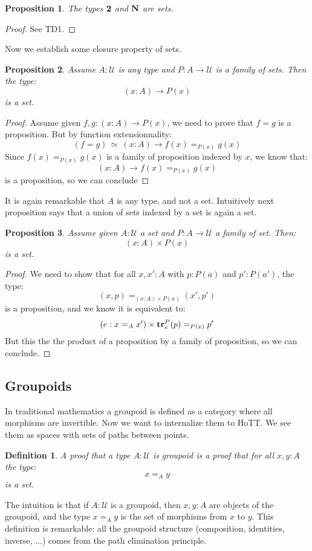 \documentclass{article}
\newcommand{\sse}[1]{\medbreak \subsection{#1}}
\newcommand{\U}{{\mathcal U}}
\renewcommand{\r}{\rightarrow}
\newcommand{\tr}{\mathrm{\bf tr}}
\newcommand{\N}{\mathrm{\bf N}}
\newcommand{\two}{{\bf 2}}
\newtheorem{definition}{Definition}
\newtheorem{proposition}{Proposition}
\begin{document}
\begin{proposition}
The types $\two$ and $\N$ are sets.
\end{proposition}
\begin{proof}
See TD1.
\end{proof}

Now we establish some closure property of sets.

\begin{proposition}
Assume $A:\U$ is any type and $P:A\r \U$ is a family of sets. Then the type:
\[(x:A)\r P(x)\]
is a set.
\end{proposition}
\begin{proof}
Assume given $f,g:(x:A)\r P(x)$, we need to prove that $f=g$ is a proposition. But by function extensionnality:
\[(f=g)\, \simeq \ (x:A)\r f(x)=_{P(x)}g(x)\]
Since $f(x)=_{P(x)}g(x)$ is a family of proposition indexed by $x$, we know that:
\[(x:A)\r f(x)=_{P(x)}g(x)\]
is a proposition, so we can conclude
\end{proof}

It is again remarkable that $A$ is any type, and not a set. Intuitively next proposition says that a union of sets indexed by a set is again a set.

\begin{proposition}
Assume given $A:\U$ a set and $P:A\r \U$ a family of set. Then:
\[(x:A)\times P(x)\]
is a set.
\end{proposition}
\begin{proof}
We need to show that for all $x,x':A$ with $p:P(a)$ and $p':P(a')$, the type:
\[(x,p)=_{(x:A)\times P(x)}(x',p')\]
is a proposition, and we know it is equivalent to:
\[(e:x=_Ax')\times \tr^P_e(p) =_{P(x)} p'\]
But this the the product of a proposition by a family of proposition, so we can conclude.
\end{proof}


\sse{Groupoids}

In traditional mathematics a groupoid is defined as a category where all morphisms are invertible. Now we want to internalize them to HoTT. We see them as spaces with sets of paths between points.

\begin{definition}
A proof that a type $A:\U$ is groupoid is a proof that for all $x,y:A$ the type:
\[x=_Ay\]
is a set.
\end{definition}

The intuition is that if $A:\U$ is a groupoid, then $x,y:A$ are objects of the groupoid, and the type $x=_Ay$ is the set of morphisms from $x$ to $y$.
This definition is remarkable: all the groupoid structure (composition, identities, inverse, ...) comes from the path elimination principle.
\end{document}
